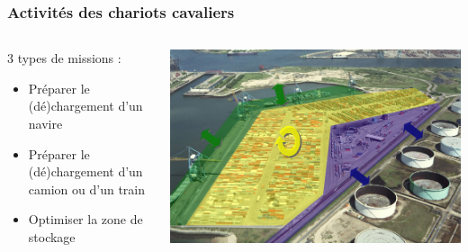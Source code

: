 \documentclass{beamer}
\begin{document}
\begin{frame}
\frametitle{Activités des chariots cavaliers}
\begin{columns}
  \begin{column}[l]{5.5cm}
	3 types de missions : 
	 \begin{itemize}
	  \item Préparer le (dé)chargement d'un \textcolor{vert}{navire}
	  \item Préparer le (dé)chargement d'un \textcolor{bleu}{camion} ou d'un \textcolor{bleu}{train}
	  \item Optimiser la zone de \textcolor{jaune}{stockage}
	\end{itemize}
\end{column}
  \begin{column}[r]{5.5cm}
	\begin{flushright}
	    \includegraphics[height=.5\textheight]{fig/threeKindsOfMissions.png}
	\end{flushright}
  \end{column}
\end{columns}
\end{frame}
\end{document}
